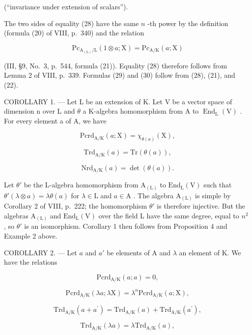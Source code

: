 (``invariance under extension of scalars'').

The two sides of equality (28) have the same \(n\) -th power by the definition (formula (20) of VIII, p.~340) and the relation

\[
\mathrm{Pc} _ {\mathrm{A} _ {(\mathrm{L})} / \mathrm{L}} (1 \otimes a; \mathrm{X}) = \mathrm{Pc} _ {\mathrm{A} / \mathrm{K}} (a; \mathrm{X})
\]

(III, §9, No.~3, p.~544, formula (21)). Equality (28) therefore follows from Lemma 2 of VIII, p.~339. Formulas (29) and (30) follow from (28), (21), and (22).

COROLLARY 1. --- Let L be an extension of K. Let V be a vector space of dimension n over L and \(\theta\) a K-algebra homomorphism from A to \(\operatorname{End}_{\mathrm{L}}(\mathrm{V})\) . For every element a of A, we have

\[
\mathrm{Pcrd} _ {\mathrm{A/K}} (a; \mathrm{X}) = \chi_ {\theta (a)} (\mathrm{X}),\tag{31}
\]

\[
\mathrm{Trd} _ {\mathrm{A/K}} (a) = \mathrm{Tr} (\theta (a)),\tag{32}
\]

\[
\mathrm{Nrd} _ {\mathrm{A/K}} (a) = \det (\theta (a)).\tag{33}
\]

Let \(\theta'\) be the L-algebra homomorphism from \(\mathrm{A}_{(\mathrm{L})}\) to \(\mathrm{End}_{\mathrm{L}}(\mathrm{V})\) such that \(\theta'(\lambda \otimes a) = \lambda \theta(a)\) for \(\lambda \in \mathrm{L}\) and \(a \in \mathrm{A}\) . The algebra \(\mathrm{A}_{(\mathrm{L})}\) is simple by Corollary 2 of VIII, p.~222; the homomorphism \(\theta'\) is therefore injective. But the algebras \(\mathrm{A}_{(\mathrm{L})}\) and \(\mathrm{End}_{\mathrm{L}}(\mathrm{V})\) over the field L have the same degree, equal to \(n^2\) , so \(\theta'\) is an isomorphism. Corollary 1 then follows from Proposition 4 and Example 2 above.

COROLLARY 2. --- Let \(a\) and \(a'\) be elements of A and \(\lambda\) an element of K. We have the relations

\[
\mathrm{Pcrd} _ {\mathrm{A/K}} (a; a) = 0,\tag{34}
\]

\[
\mathrm{Pcrd} _ {\mathrm{A/K}} (\lambda a; \lambda \mathrm{X}) = \lambda^ {n} \mathrm{Pcrd} _ {\mathrm{A/K}} (a; \mathrm{X}),\tag{35}
\]

\[
\mathrm{Trd} _ {\mathrm{A/K}} (a + a ^ {\prime}) = \mathrm{Trd} _ {\mathrm{A/K}} (a) + \mathrm{Trd} _ {\mathrm{A/K}} (a ^ {\prime}),\tag{36}
\]

\[
\mathrm{Trd} _ {\mathrm{A/K}} (\lambda a) = \lambda \mathrm{Trd} _ {\mathrm{A/K}} (a),
\]

